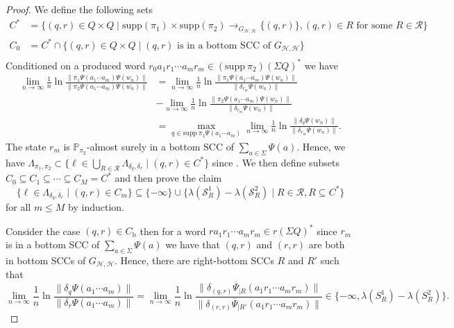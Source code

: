 \documentclass[a4paper,UKenglish,cleveref, autoref,mathscr]{lipics-v2019}
\newcommand{\PP}{\mathbb{P}}
\newcommand{\1}{\mathbbm{1}}
\newcommand{\supp}{\mathrm{supp}}
\begin{document}
\begin{proof}
We define the following sets
\begin{align*}
C^* & = \{(q,r) \in Q \times Q \mid \supp (\pi_1) \times \supp (\pi_2) \rightarrow_{G_{\mathcal{H}, \mathcal{H}}} \{(q, r)\}, (q, r) \in R \text{ for some } R \in \mathcal{R}\} \\
C_0 & = C^* \cap \{(q,r) \in Q \times Q \mid (q,r) \text{ is in a bottom SCC of }G_{\mathcal{H}, \mathcal{H}} \} \\
\end{align*}
Conditioned on a produced word $r_0 a_1 r_1 \cdots a_m r_m \in (\supp~\pi_2)(\Sigma Q)^*$ we have
\begin{align*}
\lim_{n \rightarrow \infty}\frac1n \ln\frac{\|\pi_1 \Psi(a_1 \cdots a_m) \Psi(w_n)\|}{\|\pi_2 \Psi(a_1 \cdots a_m) \Psi(w_n)\|} & = \lim_{n \rightarrow \infty}\frac1n \ln\frac{\|\pi_1 \Psi(a_1 \cdots a_m) \Psi(w_n)\|}{\|\delta_{r_m} \Psi(w_n)\|} \\
& - \lim_{n \rightarrow \infty}\frac1n \ln\frac{\|\pi_2 \Psi(a_1 \cdots a_m) \Psi(w_n)\|}{\|\delta_{r_m} \Psi(w_n)\|} \\
& = \max_{q \in \supp~ \pi_1 \Psi(a_1 \cdots a_m)}\lim_{n \rightarrow \infty}\frac1n \ln\frac{\|\delta_q \Psi(w_n)\|}{\|\delta_{r_m} \Psi(w_n)\|}.
\end{align*}
The state $r_m$ is $\PP_{\pi_2}$-almost surely in a bottom SCC of $\sum_{a \in \Sigma} \Psi(a)$. Hence, we have $\Lambda_{\pi_1,\pi_2} \subset \{\ell \in \bigcup_{R \in \mathcal{R}}\Lambda_{\delta_q, \delta_r} \mid (q, r) \in C^*\}$ since . We then define subsets $C_0 \subseteq C_1 \subseteq \cdots \subseteq C_M = C^*$ and then prove the claim
\begin{equation}\label{indclaimsccs}
\{\ell \in \Lambda_{\delta_q, \delta_r} \mid (q, r) \in C_m\} \subseteq \{-\infty\} \cup \{\lambda(\mathcal{S}^1_R) - \lambda(\mathcal{S}^2_R) \mid R \in \mathcal{R}, R \subseteq C^*\}
\end{equation}
for all $m \leq M$ by induction. 

Consider the case $(q, r) \in C_\text{b}$ then for a word $r a_1 r_1 \cdots a_m r_m \in r(\Sigma Q)^*$ since $r_m$ is in a bottom SCC of $\sum_{a \in \Sigma}\Psi(a)$ we have that $(q, r)$ and $(r, r)$ are both in bottom SCCs of $G_{\mathcal{H}, \mathcal{H}}$. Hence, there are right-bottom SCCs $R$ and $R'$ such that 
\begin{equation*}
\lim_{n\rightarrow \infty} \frac1n \ln \frac{\|\delta_q \Psi(a_1 \cdots a_m)\|}{\|\delta_r \Psi(a_1 \cdots a_m)\|} = \lim_{n\rightarrow \infty} \frac1n \ln \frac{ \| \delta_{(q, r)} \overline{\Psi}_{|R}(a_1 r_1 \cdots a_m r_m) \|}{\| \delta_{(r, r)} \overline{\Psi}_{|R'}(a_1 r_1 \cdots a_m r_m) \|} \in \{-\infty, \lambda(S^1_R) - \lambda(S^2_R)\}.
\end{equation*}


\end{proof}
\end{document}
